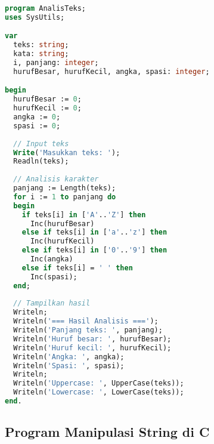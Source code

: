 \documentclass[../main.tex]{subfiles}
\begin{document}
\begin{lstlisting}[language=Pascal, caption={Program analisis teks di Pascal}]
program AnalisTeks;
uses SysUtils;

var
  teks: string;
  kata: string;
  i, panjang: integer;
  hurufBesar, hurufKecil, angka, spasi: integer;

begin
  hurufBesar := 0;
  hurufKecil := 0;
  angka := 0;
  spasi := 0;
  
  // Input teks
  Write('Masukkan teks: ');
  Readln(teks);
  
  // Analisis karakter
  panjang := Length(teks);
  for i := 1 to panjang do
  begin
    if teks[i] in ['A'..'Z'] then
      Inc(hurufBesar)
    else if teks[i] in ['a'..'z'] then
      Inc(hurufKecil)
    else if teks[i] in ['0'..'9'] then
      Inc(angka)
    else if teks[i] = ' ' then
      Inc(spasi);
  end;
  
  // Tampilkan hasil
  Writeln;
  Writeln('=== Hasil Analisis ===');
  Writeln('Panjang teks: ', panjang);
  Writeln('Huruf besar: ', hurufBesar);
  Writeln('Huruf kecil: ', hurufKecil);
  Writeln('Angka: ', angka);
  Writeln('Spasi: ', spasi);
  Writeln;
  Writeln('Uppercase: ', UpperCase(teks));
  Writeln('Lowercase: ', LowerCase(teks));
end.
\end{lstlisting}

\subsection{Program Manipulasi String di C}
\end{document}
